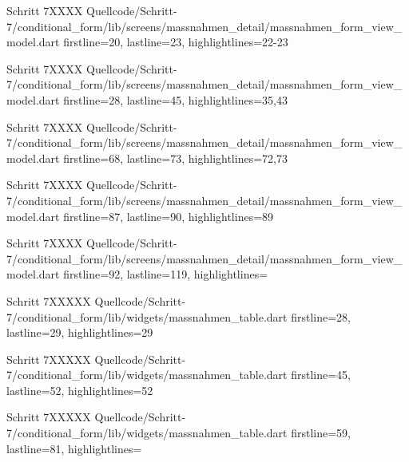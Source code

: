   \begin{alexlisting}{Schritt 7}{XXXX}
    {Quellcode/Schritt-7/conditional_form/lib/screens/massnahmen_detail/massnahmen_form_view_model.dart}
    {firstline=20, lastline=23, highlightlines={22-23}}
    \label{lst:Schritt5XXXXX}
  \end{alexlisting}
  \begin{alexlisting}{Schritt 7}{XXXX}
    {Quellcode/Schritt-7/conditional_form/lib/screens/massnahmen_detail/massnahmen_form_view_model.dart}
    {firstline=28, lastline=45, highlightlines={35,43}}
    \label{lst:Schritt5XXXXX}
  \end{alexlisting}
  \begin{alexlisting}{Schritt 7}{XXXX}
    {Quellcode/Schritt-7/conditional_form/lib/screens/massnahmen_detail/massnahmen_form_view_model.dart}
    {firstline=68, lastline=73, highlightlines={72,73}}
    \label{lst:Schritt5XXXXX}
  \end{alexlisting}
  \begin{alexlisting}{Schritt 7}{XXXX}
    {Quellcode/Schritt-7/conditional_form/lib/screens/massnahmen_detail/massnahmen_form_view_model.dart}
    {firstline=87, lastline=90, highlightlines={89}}
    \label{lst:Schritt5XXXXX}
  \end{alexlisting}
  \begin{alexlisting}{Schritt 7}{XXXX}
    {Quellcode/Schritt-7/conditional_form/lib/screens/massnahmen_detail/massnahmen_form_view_model.dart}
    {firstline=92, lastline=119, highlightlines={}}
    \label{lst:Schritt5XXXXX}
  \end{alexlisting}

  \begin{alexlisting}{Schritt 7}{XXXXX}
    {Quellcode/Schritt-7/conditional_form/lib/widgets/massnahmen_table.dart}
    {firstline=28, lastline=29, highlightlines={29}}
    \label{lst:Schritt5XXXXX}
  \end{alexlisting}
  \begin{alexlisting}{Schritt 7}{XXXXX}
    {Quellcode/Schritt-7/conditional_form/lib/widgets/massnahmen_table.dart}
    {firstline=45, lastline=52, highlightlines={52}}
    \label{lst:Schritt5XXXXX}
  \end{alexlisting}
  \begin{alexlisting}{Schritt 7}{XXXXX}
    {Quellcode/Schritt-7/conditional_form/lib/widgets/massnahmen_table.dart}
    {firstline=59, lastline=81, highlightlines={}}
    \label{lst:Schritt5XXXXX}
  \end{alexlisting}

